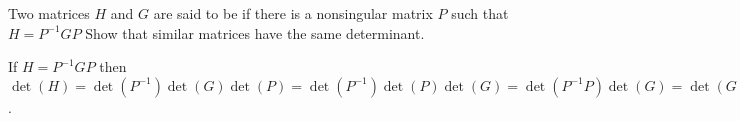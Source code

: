 

\begin{Exercise}[
name={},
title={}, 
difficulty=0,
origin={\cite{JH}}]
Two matrices $H$ and $G$ are said to be 
if there is a nonsingular matrix $P$ such that $H=P^{-1}GP$
Show that similar matrices have the same determinant.
\end{Exercise}

\begin{Answer}
If \( H=P^{-1}GP \)
      then \( \det(H)=\det(P^{-1})\det(G)\det(P)
        =\det(P^{-1})\det(P)\det(G)=\det(P^{-1}P)\det(G)
        =\det(G) \).
\end{Answer}
